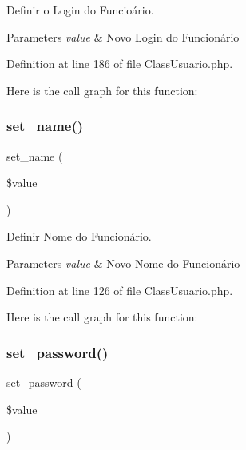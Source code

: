 Definir o Login do Funcioário. 


\begin{DoxyParams}{Parameters}
{\em value} & Novo Login do Funcionário \\
\hline
\end{DoxyParams}


Definition at line 186 of file Class\+Usuario.\+php.

Here is the call graph for this function\+:
\mbox{\label{class_class_usuario_a53e29da8f1da63502f3e13091fcb74e5}} 
\subsubsection{\texorpdfstring{set\+\_\+name()}{set\_name()}}
{\footnotesize\ttfamily set\+\_\+name (\begin{DoxyParamCaption}\item[{}]{\$value }\end{DoxyParamCaption})}



Definir Nome do Funcionário. 


\begin{DoxyParams}{Parameters}
{\em value} & Novo Nome do Funcionário \\
\hline
\end{DoxyParams}


Definition at line 126 of file Class\+Usuario.\+php.

Here is the call graph for this function\+:
\mbox{\label{class_class_usuario_a48fcdf09611589d13f8832d104aa2f52}} 
\subsubsection{\texorpdfstring{set\+\_\+password()}{set\_password()}}
{\footnotesize\ttfamily set\+\_\+password (\begin{DoxyParamCaption}\item[{}]{\$value }\end{DoxyParamCaption})}



